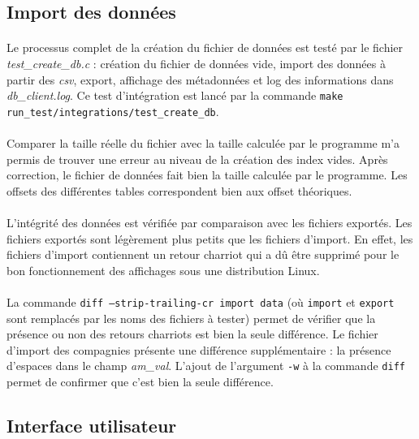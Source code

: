 \documentclass{article}
\begin{document}
    \subsection{Import des données}
    \paragraph{}
    Le processus complet de la création du fichier de données est testé par le fichier \emph{test\_create\_db.c} : création du fichier de données vide, import des données à partir des \emph{csv}, export, affichage des métadonnées et log des informations dans \emph{db\_client.log}. Ce test d'intégration est lancé par la commande \texttt{make run\_test/integrations/test\_create\_db}.

    \paragraph{}
    Comparer la taille réelle du fichier avec la taille calculée par le programme m'a permis de trouver une erreur au niveau de la création des index vides. Après correction, le fichier de données fait bien la taille calculée par le programme. Les offsets des différentes tables correspondent bien aux offset théoriques.

    \paragraph{}
    L'intégrité des données est vérifiée par comparaison avec les fichiers exportés. Les fichiers exportés sont légèrement plus petits que les fichiers d'import. En effet, les fichiers d'import contiennent un retour charriot qui a dû être supprimé pour le bon fonctionnement des affichages sous une distribution Linux.
    
    \paragraph{}
    La commande \texttt{diff --strip-trailing-cr import data} (où \texttt{import} et \texttt{export} sont remplacés par les noms des fichiers à tester) permet de vérifier que la présence ou non des retours charriots est bien la seule différence. Le fichier d'import des compagnies présente une différence supplémentaire : la présence d'espaces dans le champ \emph{am\_val}. L'ajout de l'argument \texttt{-w} à la commande \texttt{diff} permet de confirmer que c'est bien la seule différence.


    \subsection{Interface utilisateur}
\end{document}

